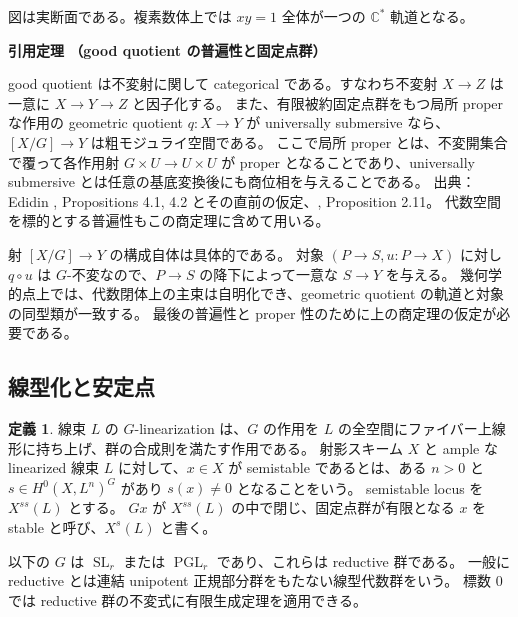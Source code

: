 \documentclass[dvipdfmx,a4paper,11pt]{article}
\theoremstyle{definition}
\newtheorem{dfn}[thm]{定義}
\newcommand{\C}{\mathbb C}\newcommand{\R}{\mathbb R}\newcommand{\Z}{\mathbb Z}\newcommand{\Q}{\mathbb Q}
\DeclareMathOperator{\SL}{SL}\DeclareMathOperator{\PGL}{PGL}\DeclareMathOperator{\PSL}{PSL}
\newenvironment{external}[1]{\Needspace{7\baselineskip}\refstepcounter{thm}\begin{tcolorbox}[mybox,colback=blue!2,colframe=blue!40!black]\textbf{引用定理 \thethm（#1）}\par}{\end{tcolorbox}}
\begin{document}
\par\medskip
\noindent\begin{minipage}{\linewidth}
\begin{center}
\end{center}
図は実断面である。複素数体上では $xy=1$ 全体が一つの $\C^*$ 軌道となる。
\end{minipage}\par\medskip

\begin{external}{good quotient の普遍性と固定点群}
good quotient は不変射に関して categorical である。すなわち不変射 $X\to Z$ は一意に $X\to Y\to Z$ と因子化する。
また、有限被約固定点群をもつ局所 proper な作用の geometric quotient $q:X\to Y$ が universally submersive なら、$[X/G]\to Y$ は粗モジュライ空間である。
ここで局所 proper とは、不変開集合で覆って各作用射 $G\times U\to U\times U$ が proper となることであり、universally submersive とは任意の基底変換後にも商位相を与えることである。
出典：Edidin \cite{Edidin}, Propositions 4.1, 4.2 とその直前の仮定、\cite{Vistoli}, Proposition 2.11。
代数空間を標的とする普遍性もこの商定理に含めて用いる。
\end{external}
射 $[X/G]\to Y$ の構成自体は具体的である。
対象 $(P\to S,u:P\to X)$ に対し $q\circ u$ は $G$-不変なので、$P\to S$ の降下によって一意な $S\to Y$ を与える。
幾何学的点上では、代数閉体上の主束は自明化でき、geometric quotient の軌道と対象の同型類が一致する。
最後の普遍性と proper 性のために上の商定理の仮定が必要である。

\subsection{線型化と安定点}
\begin{dfn}
線束 $L$ の $G$-linearization は、$G$ の作用を $L$ の全空間にファイバー上線形に持ち上げ、群の合成則を満たす作用である。
射影スキーム $X$ と ample な linearized 線束 $L$ に対して、$x\in X$ が semistable であるとは、ある $n>0$ と $s\in H^0(X,L^n)^G$ があり $s(x)\neq0$ となることをいう。
semistable locus を $X^{ss}(L)$ とする。
$Gx$ が $X^{ss}(L)$ の中で閉じ、固定点群が有限となる $x$ を stable と呼び、$X^s(L)$ と書く。
\end{dfn}
以下の $G$ は $\SL_r$ または $\PGL_r$ であり、これらは reductive 群である。
一般に reductive とは連結 unipotent 正規部分群をもたない線型代数群をいう。
標数 $0$ では reductive 群の不変式に有限生成定理を適用できる。
\end{document}
